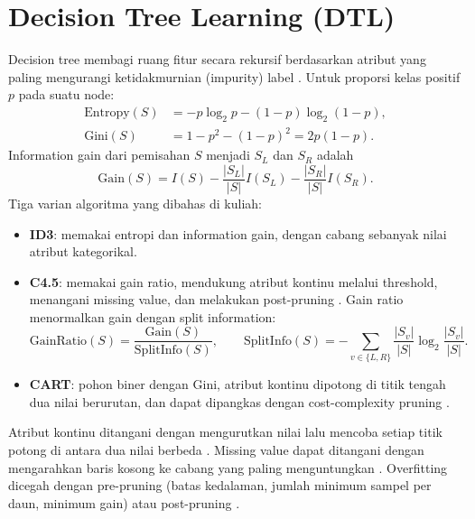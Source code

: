 \section{Decision Tree Learning (DTL)}
Decision tree membagi ruang fitur secara rekursif berdasarkan atribut yang paling mengurangi ketidakmurnian (impurity) label \cite{ref:dtl03,ref:dtl04}. Untuk proporsi kelas positif $p$ pada suatu node:
\begin{align}
  \text{Entropy}(S) &= -p\log_2 p - (1-p)\log_2(1-p), \\
  \text{Gini}(S) &= 1 - p^2 - (1-p)^2 = 2p(1-p).
\end{align}
Information gain dari pemisahan $S$ menjadi $S_L$ dan $S_R$ adalah
\begin{equation}
  \text{Gain}(S) = I(S) - \frac{|S_L|}{|S|} I(S_L) - \frac{|S_R|}{|S|} I(S_R).
\end{equation}
Tiga varian algoritma yang dibahas di kuliah:
\begin{itemize}
  \item \textbf{ID3}: memakai entropi dan information gain, dengan cabang sebanyak nilai atribut kategorikal.
  \item \textbf{C4.5}: memakai gain ratio, mendukung atribut kontinu melalui threshold, menangani missing value, dan melakukan post-pruning \cite{ref:quinlan}. Gain ratio menormalkan gain dengan split information:
  \begin{equation}
    \text{GainRatio}(S) = \frac{\text{Gain}(S)}{\text{SplitInfo}(S)}, \qquad
    \text{SplitInfo}(S) = -\sum_{v\in\{L,R\}} \frac{|S_v|}{|S|}\log_2\frac{|S_v|}{|S|}.
  \end{equation}
  \item \textbf{CART}: pohon biner dengan Gini, atribut kontinu dipotong di titik tengah dua nilai berurutan, dan dapat dipangkas dengan cost-complexity pruning \cite{ref:breiman}.
\end{itemize}
Atribut kontinu ditangani dengan mengurutkan nilai lalu mencoba setiap titik potong di antara dua nilai berbeda \cite{ref:dtlcont}. Missing value dapat ditangani dengan mengarahkan baris kosong ke cabang yang paling menguntungkan \cite{ref:dtlmiss}. Overfitting dicegah dengan pre-pruning (batas kedalaman, jumlah minimum sampel per daun, minimum gain) atau post-pruning \cite{ref:dtloverfit}.

